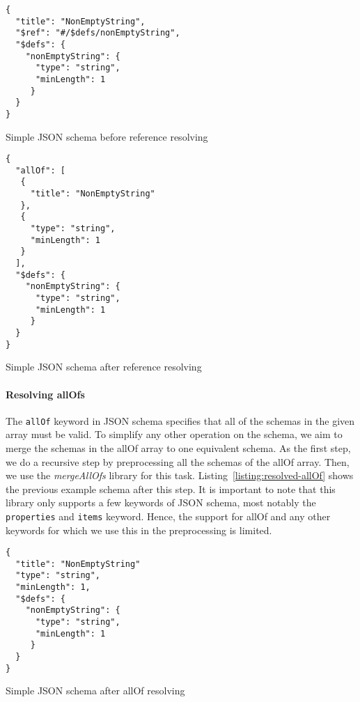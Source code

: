 \begin{listing}[!h]
    \begin{verbatim}
{
  "title": "NonEmptyString",
  "$ref": "#/$defs/nonEmptyString",
  "$defs": {
    "nonEmptyString": {
      "type": "string",
      "minLength": 1
     }
  }
}
    \end{verbatim}
    \caption{Simple JSON schema before reference resolving}
    \label{listing:preprocessing-example}
\end{listing}

\begin{listing}[!h]
    \begin{verbatim}
{
  "allOf": [
   {
     "title": "NonEmptyString"
   },
   {
     "type": "string",
     "minLength": 1
   }
  ],
  "$defs": {
    "nonEmptyString": {
      "type": "string",
      "minLength": 1
     }
  }
}
    \end{verbatim}
    \caption{Simple JSON schema after reference resolving}
    \label{listing:reference-resolving}
\end{listing}

\paragraph{Resolving allOfs}

The \texttt{allOf} keyword in JSON schema specifies that all of the schemas in the given array must be valid.
To simplify any other operation on the schema, we aim to merge the schemas in the allOf array to one equivalent schema.
As the first step, we do a recursive step by preprocessing all the schemas of the allOf array.
Then, we use the \textit{mergeAllOfs} library %
for this task.
Listing~\ref{listing:resolved-allOf} shows the previous example schema after this step.
It is important to note that this library only supports a few keywords of JSON schema, most notably the
\texttt{properties} and \texttt{items} keyword.
Hence, the support for allOf and any other keywords for which we use this in the preprocessing is limited.

\begin{listing}[!h]
    \begin{verbatim}
{
  "title": "NonEmptyString"
  "type": "string",
  "minLength": 1,
  "$defs": {
    "nonEmptyString": {
      "type": "string",
      "minLength": 1
     }
  }
}
    \end{verbatim}
    \caption{Simple JSON schema after allOf resolving}
    \label{listing:resolved-allOf}
\end{listing}

